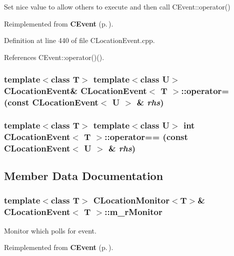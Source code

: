 Set nice value to allow others to execute and then call CEvent::operator() 

Reimplemented from {\bf CEvent} {\rm (p.\,\pageref{classCEvent_b4})}.

Definition at line 440 of file CLocation\-Event.cpp.

References CEvent::operator()().
\subsubsection{\setlength{\rightskip}{0pt plus 5cm}template$<$class T$>$ template$<$class U$>$ CLocation\-Event\& CLocation\-Event$<$ T $>$::operator= (const CLocation\-Event$<$ U $>$ \& {\em rhs})\hspace{0.3cm}{\tt  [private]}}\label{classCLocationEvent_c1}


\subsubsection{\setlength{\rightskip}{0pt plus 5cm}template$<$class T$>$ template$<$class U$>$ int CLocation\-Event$<$ T $>$::operator== (const CLocation\-Event$<$ U $>$ \& {\em rhs})\hspace{0.3cm}{\tt  [private]}}\label{classCLocationEvent_c2}




\subsection{Member Data Documentation}
\subsubsection{\setlength{\rightskip}{0pt plus 5cm}template$<$class T$>$ {\bf CLocation\-Monitor}$<$T$>$\& CLocation\-Event$<$ T $>$::m\_\-r\-Monitor\hspace{0.3cm}{\tt  [private]}}\label{classCLocationEvent_o1}


Monitor which polls for event.



Reimplemented from {\bf CEvent} {\rm (p.\,\pageref{classCEvent_o4})}.

